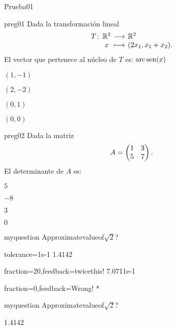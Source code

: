 \documentclass[10pt]{article}
\begin{document}
\begin{quiz}{Prueba01}

\begin{multi}{preg01}
    Dada la transformación lineal
    \[
        \funcion{T}{\R^2}{\R^2}{x}{(2x_1,x_1+x_2).}
    \]
    El vector que pertenece al núcleo de $T$ es: $\operatorname{arc\,sen}(x)$
    \item $(1,-1)$
    \item $(2,-2)$
    \item $(0,1)$
    \item* $(0,0)$
\end{multi}

\begin{multi}{preg02}
    Dada la matriz 
    \[
        A=
        \begin{pmatrix}
        1&3\cr
        5&7
        \end{pmatrix}.
    \]
    El determinante de $A$ es:
    \item $5$
    \item* $-8$
    \item $3$
    \item $0$
\end{multi}

\begin{numerical}[tolerance=0.01]{myquestion} 
    Approximatevalueof$\sqrt{2}$? 
    \item[tolerance={1e-1}]1.4142 
    \item[fraction=20,feedback={twicethis!}]7.0711e-1 \item[fraction=0,feedback={Wrong!}] * 
\end{numerical}

\begin{numerical}[tolerance=0.01]{myquestion} 
    Approximatevalueof$\sqrt{2}$? 
    \item 1.4142 
\end{numerical}

\end{quiz}
\end{document}
